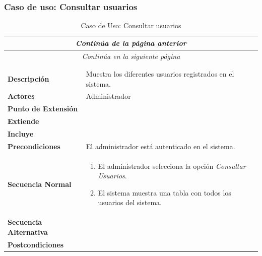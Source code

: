 \subsubsection*{Caso de uso: Consultar usuarios }
\begin{longtable}{| p{4cm} | p{10cm} |}
\endfirsthead
\multicolumn{2}{c}{\textit{Continúa de la página anterior}}\\[12pt]
\hline
\endhead
\hline
\multicolumn{2}{c}{\textit{Continúa en la siguiente página}} \\
\endfoot
\hline
\caption{Caso de Uso: Consultar usuarios}\label{fig:1}\\
\endlastfoot


\hline
\multicolumn{2}{|c|}{\textbf{CU$<$23$>$ - Consultar Usuarios}} \\

\hline
\textbf{Descripción} &
Muestra los diferentes usuarios registrados en el sistema.\\

\hline
\textbf{Actores} &
Administrador\\

\hline
\textbf{Punto de Extensión} &
\\

\hline
\textbf{Extiende} &
\\

\hline
\textbf{Incluye} &
\\

\hline
\textbf{Precondiciones} &
El administrador está autenticado en el sistema.\\

\hline
\textbf{Secuencia Normal} &\mbox{}\par\vspace{-\baselineskip}
\begin{enumerate}[leftmargin=0.7cm, topsep=0.1cm]
\item El administrador selecciona la opción \textit{Consultar Usuarios}.
\item El sistema muestra una tabla con todos los usuarios del sistema.
\end{enumerate}


\\
\hline
\textbf{Secuencia Alternativa} &\mbox{}\par\vspace{-\baselineskip}
\\

\hline
\textbf{Postcondiciones} & \\
\hline
\end{longtable}



